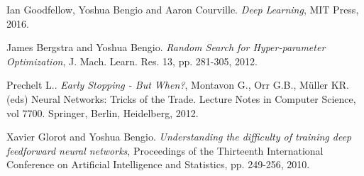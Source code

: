 \documentclass[11pt,twoside]{article}
\begin{document}

\begin{thebibliography}{99} %
    Ian Goodfellow, Yoshua Bengio and Aaron Courville.
    \textit{Deep Learning}, MIT Press, 2016.

    James Bergstra and Yoshua Bengio.
    \textit{Random Search for Hyper-parameter Optimization}, J. Mach. Learn. Res. 13, pp. 281-305, 2012.

    Prechelt L..
    \textit{Early Stopping - But When?}, Montavon G., Orr G.B., Müller KR. (eds) Neural Networks: Tricks of the Trade. Lecture Notes in Computer Science, vol 7700. Springer, Berlin, Heidelberg, 2012.

    Xavier Glorot and Yoshua Bengio.
    \textit{Understanding the difficulty of training deep feedforward neural networks},
    Proceedings of the Thirteenth International Conference on Artificial Intelligence and Statistics, pp.
    249-256, 2010.
\end{thebibliography}

\end{document}
